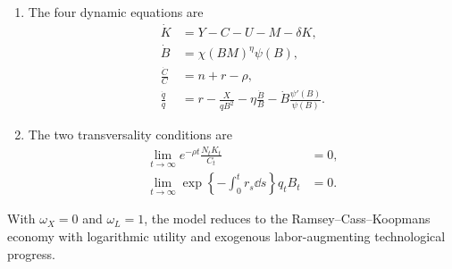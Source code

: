 \begin{definition}[Equilibrium]
\begin{enumerate}
\begin{subequations}
\begin{align}
\end{align}
\end{subequations}
\item The four dynamic equations are
\begin{subequations}
\label{eq:rewrite-equilibrium-dynamics}
\begin{align}
 \dot K&=Y-C-U-M-\delta K,
 \label{eq:rewrite-eq-kdot}\\
 \dot B&=\chi(BM)^\eta\psi(B),
 \label{eq:rewrite-eq-bdot}\\
 \frac{\dot C}{C}&=n+r-\rho,
 \label{eq:rewrite-eq-cdot}\\
 \frac{\dot q}{q}&=r-\frac{X}{qB^2}-\eta\frac{\dot B}{B}
 -\dot B\frac{\psi'(B)}{\psi(B)}.
 \label{eq:rewrite-eq-qdot}
\end{align}
\end{subequations}
\item The two transversality conditions are
\begin{subequations}
\label{eq:rewrite-equilibrium-tvcs}
\begin{align}
 \lim_{t\to\infty}e^{-\rho t}\frac{N_tK_t}{C_t}&=0,
 \label{eq:rewrite-eq-household-tvc}\\
 \lim_{t\to\infty}
 \exp\left\{-\int_0^t r_s\dd s\right\}q_tB_t&=0.
 \label{eq:rewrite-eq-developer-tvc}
\end{align}
\end{subequations}
\end{enumerate}
\end{definition}

\begin{remark}
\label{rem:rewrite-no-ai}
With $\omega_X=0$ and $\omega_L=1$, the model reduces to the
Ramsey--Cass--Koopmans economy with logarithmic utility and exogenous
labor-augmenting technological progress.
\end{remark}

